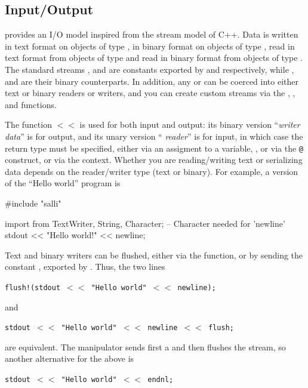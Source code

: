 \subsection{Input/Output}
\salli provides an I/O model inspired from the stream model of C++.
Data is written in text format on objects of type
, in binary format on objects of type
, read in text format from
objects of type 
and read in binary format from objects of type .
The standard streams ,
 and 
are constants exported
by  and  respectively,
while , 
and  are their binary
counterparts.
In addition, any  or  can be coerced into either
text or binary readers or writers, and you can create
custom streams via the ,
,
 and 
functions.

The function {\tt $<<$} is used for both input and output:
its binary version ``{\em writer}  {\em data}''
is for output,
and its unary version `` {\em reader}'' is for input,
in which
case the return type must be specified, either via an assigment to a variable,
, or via the {\tt @} construct, or via
the context. Whether you are reading/writing text or serializing data depends
on the reader/writer type (text or binary).
For example, a \salli version of the ``Hello world'' program is
\begin{ttyout}
#include "salli"

import from TextWriter, String, Character;  -- Character needed for 'newline'
stdout << "Hello world!" << newline;
\end{ttyout}
Text and binary writers can be flushed, either via the
function, or by sending the constant ,
exported by . Thus, the two lines\\
\centerline{\tt flush!(stdout $<<$ "Hello world" $<<$ newline);}
and\\
\centerline{\tt stdout $<<$ "Hello world" $<<$ newline $<<$ flush;}
are equivalent. The manipulator 
sends first a 
and then flushes the stream, so another alternative for the above is\\
\centerline{\tt stdout $<<$ "Hello world" $<<$ endnl;}

